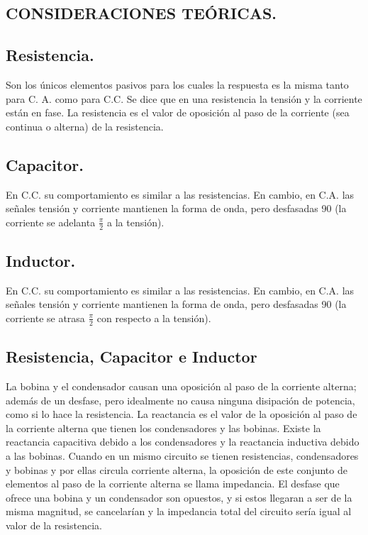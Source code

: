 \begin{multicols}{2}

\section{CONSIDERACIONES TEÓRICAS.}
	\subsection{Resistencia.}
		Son los únicos elementos pasivos para los cuales la respuesta es la misma tanto para C. A. como para C.C. 
		Se dice que en una resistencia la tensión y la corriente están en fase.
		La resistencia es el valor de oposición al paso de la corriente (sea continua o alterna) de la resistencia.
	\subsection{Capacitor.}
		En C.C. su comportamiento es similar a las resistencias. 
		En cambio, en C.A. las señales tensión y corriente mantienen la forma de onda, pero desfasadas 90 (la corriente se adelanta $\frac{\pi}{2}$ a la tensión). 
	\subsection{Inductor.}
		En C.C. su comportamiento es similar a las resistencias.
		En cambio, en C.A. las señales tensión y corriente mantienen la forma de onda, pero desfasadas 90 (la corriente se atrasa $\frac{\pi}{2}$ con respecto a la tensión).
	\subsection{Resistencia, Capacitor e Inductor}
		La bobina y el condensador causan una oposición al paso de la corriente alterna; además de un desfase, pero idealmente no causa ninguna disipación de potencia, como si lo hace la resistencia.
		La reactancia es el valor de la oposición al paso de la corriente alterna que tienen los condensadores y las bobinas.
		Existe la reactancia capacitiva debido a los condensadores y la reactancia inductiva debido a las bobinas.
		Cuando en un mismo circuito se tienen resistencias, condensadores y bobinas y por ellas circula corriente alterna, la oposición de este conjunto de elementos al paso de la corriente alterna se llama impedancia.
		El desfase que ofrece una bobina y un condensador son opuestos, y si estos llegaran a ser de la misma magnitud, se cancelarían y la impedancia total del circuito sería igual al valor de la resistencia.

\end{multicols}
